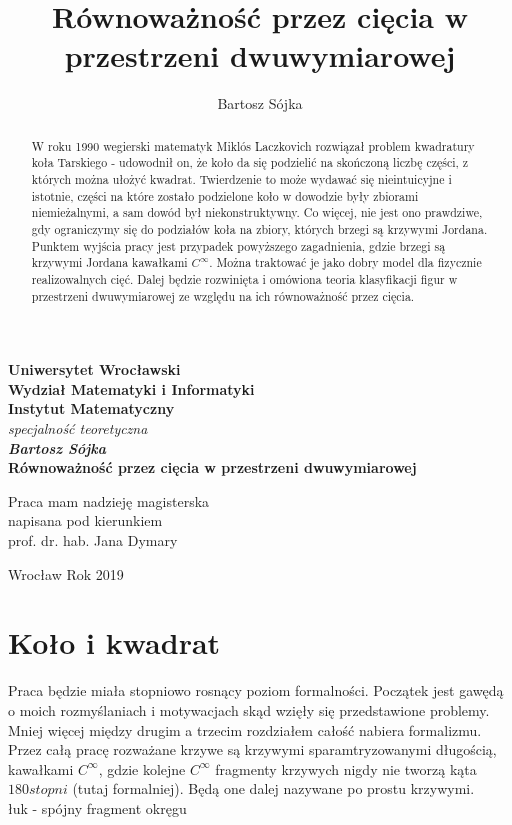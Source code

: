\documentclass[a4paper, 12pt]{article}
\title{Równoważność przez cięcia w przestrzeni dwuwymiarowej}
\author{Bartosz Sójka}
\begin{document}
\thispagestyle{empty}
\begin{center}
\textbf{\large Uniwersytet Wrocławski\\
Wydział Matematyki i Informatyki\\
Instytut Matematyczny}\\
\textit{\large specjalność teoretyczna}\\
\vspace{4cm}
\textbf{\textit{\large Bartosz Sójka}\\
\vspace{0.5cm}
{\Large Równoważność przez cięcia w przestrzeni dwuwymiarowej}}\\
\end{center}
\vspace{3cm}
{\large \hspace*{6.5cm}Praca mam nadzieję magisterska\\
\hspace*{6.5cm}napisana pod kierunkiem\\
\hspace*{6.5cm}prof. dr. hab. Jana Dymary }\\
\vfill
\begin{center}
{\large Wrocław Rok 2019}\\
\end{center}
\newpage
\null
\thispagestyle{empty}
\newpage
\tableofcontents

\begin{abstract}
    W roku 1990 wegierski matematyk Miklós Laczkovich rozwiązał problem kwadratury koła Tarskiego - udowodnił
     on, że koło da się podzielić na skończoną liczbę części, z których można ułożyć kwadrat. Twierdzenie
     to może wydawać się nieintuicyjne i istotnie, części na które zostało podzielone koło w dowodzie były
     zbiorami niemieżalnymi, a sam dowód był niekonstruktywny. Co więcej, nie jest ono prawdziwe, gdy
     ograniczymy się do podziałów koła na zbiory, których brzegi są krzywymi Jordana. Punktem wyjścia
     pracy jest przypadek powyższego zagadnienia, gdzie brzegi są krzywymi Jordana kawałkami $C^\infty$.
     Można traktować je jako dobry model dla fizycznie realizowalnych cięć. Dalej będzie rozwinięta i
     omówiona teoria klasyfikacji figur w przestrzeni dwuwymiarowej ze względu na ich równoważność przez
     cięcia.
 \end{abstract}

 \section{Koło i kwadrat}
Praca będzie miała stopniowo rosnący poziom formalności. Początek jest gawędą o moich rozmyślaniach i
motywacjach skąd wzięły się przedstawione problemy. Mniej więcej między drugim a trzecim rozdziałem
całość nabiera formalizmu. Przez całą pracę rozważane krzywe są krzywymi sparamtryzowanymi długością,
 kawałkami $C^\infty$, gdzie kolejne $C^\infty$ fragmenty krzywych nigdy nie tworzą kąta $180 stopni$
 (tutaj formalniej). Będą one dalej nazywane po prostu krzywymi. \\
łuk - spójny fragment okręgu \\[16pt]
\end{document}
